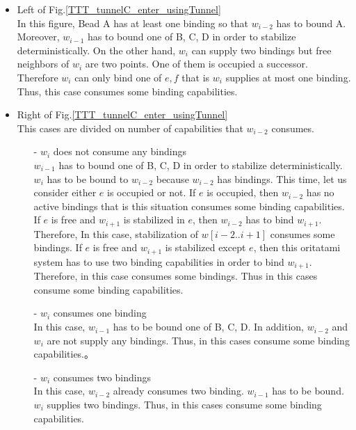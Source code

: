 \documentclass[runningheads]{llncs}
\begin{document}
\begin{itemize}
\item{Left of Fig.\ref{TTT_tunnelC_enter_usingTunnel}}\\
  In this figure, Bead A has at least one binding so that $w_{i-2}$ has to bound A. Moreover, $w_{i-1}$ has to bound one of B, C, D in order to stabilize deterministically. On the other hand, $w_i$ can supply two bindings but free neighbors of $w_i$ are two points. One of them is occupied a successor. Therefore $w_i$ can only bind one of $e,f$ that is $w_i$ supplies at most one binding. Thus, this case consumes some binding capabilities.

\item{Right of Fig.\ref{TTT_tunnelC_enter_usingTunnel}}\\
  This cases are divided on number of capabilities that $w_{i-2}$ consumes.
  \begin{itemize}
  \item[-]{$w_i$ does not consume any bindings}\\
    $w_{i-1}$ has to bound one of B, C, D in order to stabilize deterministically. $w_i$ has to be bound to $w_{i-2}$ because $w_{i-2}$ has bindings. This time, let us consider either $e$ is occupied or not. If $e$ is occupied, then $w_{i-2}$ has no active bindings that is this situation consumes some binding capabilities. If $e$ is free and $w_{i+1}$ is stabilized in $e$, then $w_{i-2}$ has to bind $w_{i+1}$. Therefore, In this case, stabilization of $w[i-2..i+1]$ consumes some bindings. If $e$ is free and $w_{i+1}$ is stabilized except $e$, then this oritatami system has to use two binding capabilities in order to bind $w_{i+1}$. Therefore, in this case consumes some bindings. Thus in this cases consume some binding capabilities.

  \item[-]{$w_i$ consumes one binding}\\
    In this case, $w_{i-1}$ has to be bound one of B, C, D. In addition, $w_{i-2}$ and $w_i$ are not supply any bindings. Thus, in this cases consume some binding capabilities.。
  \item[-]{$w_i$ consumes two bindings}\\
    In this case, $w_{i-2}$ already consumes two binding. $w_{i-1}$ has to be bound. $w_i$ supplies two bindings. Thus, in this cases consume some binding capabilities.
   
  \end{itemize}
\end{itemize}
\end{document}
